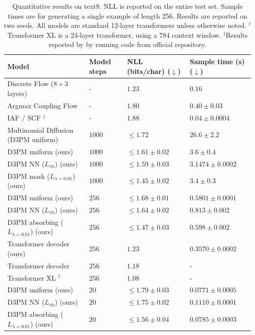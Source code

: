 \begin{table}[b]
  \caption{Quantitative results on text8. NLL is reported on the entire test set. Sample times are for generating a single example of length 256. Results are reported on two seeds. All models are standard 12-layer transformers unless otherwise noted. $^\dagger$Transformer XL is a 24-layer transformer, using a 784 context window. $^\ddagger$Results reported by \citep{hoogeboom2021argmax} by running code from official repository.}
  \label{tab:text8}
  \scriptsize
  \centering
  \begin{tabular}{llll}
    \toprule
    Model & Model steps & NLL (bits/char) ($\downarrow$) & Sample time (s) ($\downarrow$)\\
    \midrule
    Discrete Flow \citep{tran2019discrete} ($8\times 3$ layers) & - & $1.23$ & $0.16$ \\
    Argmax Coupling Flow \citep{hoogeboom2021argmax} & - & $1.80$ & $0.40 \pm 0.03$ \\
    IAF / SCF \citep{Ziegler2019}$^\ddagger$ & - & $1.88$ & $0.04 \pm 0.0004$\\
    Multinomial Diffusion (D3PM uniform) \citep{hoogeboom2021argmax} & $1000$  & $\leq 1.72$ & $26.6\pm 2.2$   \\
    \midrule
    D3PM uniform \citep{hoogeboom2021argmax} (ours) & $1000$  & $\leq 1.61\pm 0.02$ & $3.6\pm 0.4$  \\
    D3PM NN ($L_{\mathrm{vb}}$) (ours) & $1000$ & $\leq 1.59\pm 0.03$ & $3.1474\pm 0.0002$ \\
    D3PM mask ($L_{\lambda=0.01}$) (ours) & $1000$ & $\leq 1.45\pm 0.02$ & $3.4\pm 0.3$ \\
    \midrule
    D3PM uniform \citep{hoogeboom2021argmax} (ours) & $256$ & $\leq 1.68\pm0.01$ & $0.5801\pm 0.0001$ \\
    D3PM NN ($L_{\mathrm{vb}}$) (ours) & $256$ & $\leq 1.64\pm 0.02$ & $0.813\pm 0.002$ \\
    D3PM absorbing ($L_{\lambda=0.01}$) (ours) & $256$ & $\leq 1.47\pm 0.03$ & $0.598\pm 0.002$ \\
    Transformer decoder (ours) & $256$ & $1.23$ & $0.3570\pm 0.0002$\\
    Transformer decoder \citep{al_rfou} & $256$ & $1.18$ & -\\
    Transformer XL \citep{transformer_xl}$^\dagger$ & $256$ & $1.08$ & - \\
    \midrule
    D3PM uniform \citep{hoogeboom2021argmax} (ours) & $20$ & $\leq1.79\pm 0.03$ & $0.0771\pm 0.0005$ \\   
    D3PM NN ($L_{\mathrm{vb}}$) (ours) & $20$ & $\leq 1.75\pm0.02$ & $0.1110\pm 0.0001$ \\
    D3PM absorbing ($L_{\lambda=0.01}$) (ours) & $20$ & $\leq 1.56\pm0.04$ & $0.0785\pm 0.0003$ \\
    \bottomrule
  \end{tabular}
\end{table}